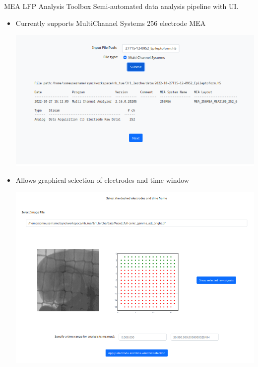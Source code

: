 \documentclass[10pt]{beamer}
\begin{document}
\begin{frame}[allowframebreaks]{MEA LFP Analysis Toolbox}
    Semi-automated data analysis pipeline with UI. \\ [1em]
    \begin{itemize}
     \item Currently supports MultiChannel Systems 256 electrode MEA \\ [1em]
      \begin{center}
        \includegraphics[keepaspectratio,width=0.8\framewidth]{img/4_import.png}
      \end{center}
      \framebreak
      
     \item Allows graphical selection of electrodes and time window \\ [1em]
      \begin{center}
        \includegraphics[keepaspectratio,width=0.8\framewidth]{img/4_select.png}
      \end{center}
      \framebreak
      

\end{itemize}
\end{frame}
\end{document}
